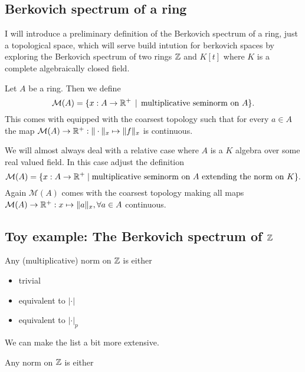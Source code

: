 
\subsection{Berkovich spectrum of a ring} \label{sec:berkovich_spectrum_of_a_ring}

I will introduce a preliminary definition of the Berkovich spectrum of a ring, just a topological space, which will serve build intution for berkovich spaces by exploring the Berkovich spectrum of two rings $\mathbb{Z}$ and $K[t]$ where $K$ is a complete algebraically closed field. 

\begin{definition}
	Let $A$ be a ring. Then we define \[
		\mathcal{M} (A) = \{x: A \to \R^{+} \st \text{multiplicative seminorm on } A\} 
	.\] 
	This comes with equipped with the coarsest topology such that for every $a \in A$ the map $\mathcal{M} (A) \to \mathbb{R}^{+}: \|\cdot \|_x \mapsto \|f\|_x $ is continuous. 

	We will almost always deal with a relative case where $A$ is a $K$ algebra over some real valued field. In this case adjust the definition \[
		\mathcal{M} (A) = \{x : A \to \mathbb{R}^{ + }  \mid \text{multiplicative seminorm on }A \text{ extending the norm on } K\} 
	.\] 
	Again $\mathcal{M} (A)$ comes with the coarsest topology making all maps $\mathcal{M} (A) \to \mathbb{R}^{+}: x \mapsto \|a\|_x, \forall a \in A$ continuous. 
\end{definition}

\subsection{Toy example: The Berkovich spectrum of $\mathbb{Z}$} \label{sec:toy_example:_the_berkovich_spectrum_of_Z}

\begin{theorem}
	[Ostrowski]
	Any (multiplicative) norm on  $\mathbb{Z}$ is either
	\begin{itemize}
		\item  trivial
		\item equivalent to  $|\cdot |$
		\item equivalent to $|\cdot |_p$
	\end{itemize}
\end{theorem}

We can make the list a bit more extensive. 
\begin{corollary}
	Any norm on $\mathbb{Z}$ is either  
\end{corollary}




